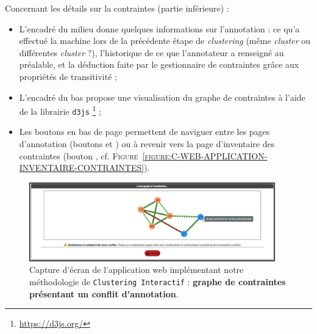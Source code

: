 			Concernant les détails sur la contraintes (partie inférieure) :
			\begin{itemize}
				\item L'encadré du milieu donne quelques informations sur l'annotation : ce qu'a effectué la machine lors de la précédente étape de \textit{clustering} (même \textit{cluster} ou différentes \textit{cluster} ?), l'historique de ce que l'annotateur a renseigné au préalable, et la déduction faite par le gestionnaire de contraintes grâce aux propriétés de transitivité ;
				\item L'encadré du bas propose une visualisation du graphe de contraintes à l'aide de la librairie \texttt{d3js} \footnote {
					\url{https://d3js.org/}
				} ;
				\item Les boutons en bas de page permettent de naviguer entre les pages d'annotation (boutons \textguillemets{\faAngleLeft} et \textguillemets{\faAngleRight}) ou à revenir vers la page d'inventaire des contraintes (bouton \textguillemets{\faList}, cf. \textsc{Figure~\ref{figure:C-WEB-APPLICATION-INVENTAIRE-CONTRAINTES}}).
			\end{itemize}
			
			\begin{figure}[H]
				\centering
				\includegraphics[width=0.95\textwidth]{figures/interactive-clustering-application-annotation-4conflit}
				\caption{
					Capture d'écran de l'application web implémentant notre méthodologie de \texttt{Clustering Interactif} : \textbf{graphe de contraintes présentant un conflit d'annotation}.
				}
				\label{figure:C-WEB-APPLICATION-CONFLIT}
			\end{figure}
			
